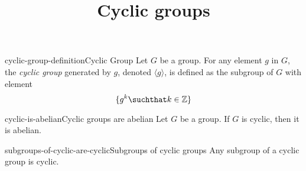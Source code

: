 \documentclass[preview]{standalone}
\begin{document}
\title{Cyclic groups}
\genpage


\begin{snippetdefinition}{cyclic-group-definition}{Cyclic Group}
    Let \(G\) be a group. For any element \(g\) in \(G\),
    the \textit{cyclic group} generated by \(g\), denoted \(\langle g \rangle\),
    is defined as the subgroup of \(G\) with element
    \[
        \{ g^k \suchthat k \in \mathbb{Z} \}
    \]
\end{snippetdefinition}

\begin{snippetcorollary}{cyclic-is-abelian}{Cyclic groups are abelian}
    Let \(G\) be a group. If \(G\) is cyclic, then it is abelian.
\end{snippetcorollary}


\begin{snippettheorem}{subgroups-of-cyclic-are-cyclic}{Subgroups of cyclic groups}
    Any subgroup of a cyclic group is cyclic.
\end{snippettheorem}
\end{document}
